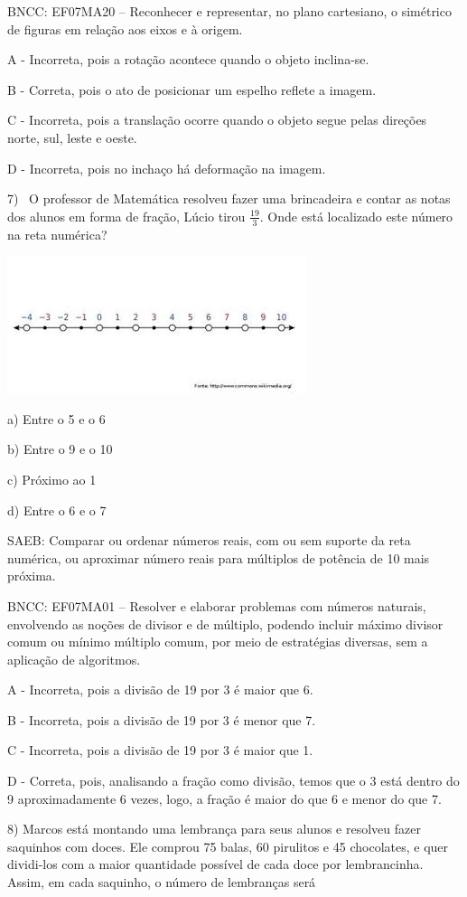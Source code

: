 BNCC: EF07MA20 -- Reconhecer e representar, no plano cartesiano, o
simétrico de figuras em relação aos eixos e à origem.

A - Incorreta, pois a rotação acontece quando o objeto inclina-se.

B - Correta, pois o ato de posicionar um espelho reflete a imagem.

C - Incorreta, pois a translação ocorre quando o objeto segue pelas
direções norte, sul, leste e oeste.

D - Incorreta, pois no inchaço há deformação na imagem.

7)~ O professor de Matemática resolveu fazer uma brincadeira e contar as
notas dos alunos em forma de fração, Lúcio tirou \(\frac{19}{3}\). Onde
está localizado este número na reta numérica?

\includegraphics{./imgSAEB_7_MAT/media/image109.png}

a) Entre o 5 e o 6

b) Entre o 9 e o 10

c) Próximo ao 1

d) Entre o 6 e o 7

SAEB: Comparar ou ordenar números reais, com ou sem suporte da reta
numérica, ou aproximar número reais para múltiplos de potência de 10
mais próxima.

BNCC: EF07MA01 -- Resolver e elaborar problemas com números naturais,
envolvendo as noções de divisor e de múltiplo, podendo incluir máximo
divisor comum ou mínimo múltiplo comum, por meio de estratégias
diversas, sem a aplicação de algoritmos.

A - Incorreta, pois a divisão de 19 por 3 é maior que 6.

B - Incorreta, pois a divisão de 19 por 3 é menor que 7.

C - Incorreta, pois a divisão de 19 por 3 é maior que 1.

D - Correta, pois, analisando a fração como divisão, temos que o 3 está
dentro do 9 aproximadamente 6 vezes, logo, a fração é maior do que 6 e
menor do que 7.

8) Marcos está montando uma lembrança para seus alunos e resolveu fazer
saquinhos com doces. Ele comprou 75 balas, 60 pirulitos e 45 chocolates,
e quer dividi-los com a maior quantidade possível de cada doce por
lembrancinha. Assim, em cada saquinho, o número de lembranças será

